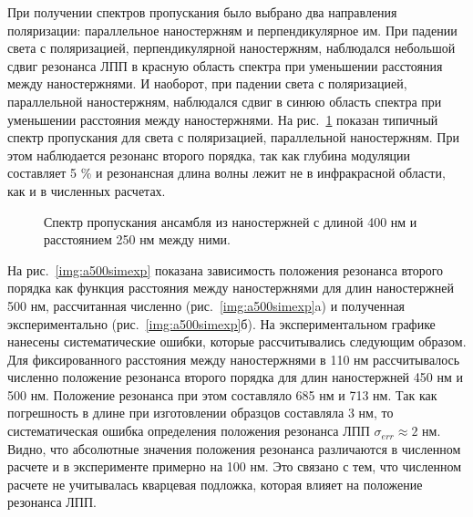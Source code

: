 При получении спектров пропускания было выбрано два направления поляризации: параллельное наностержням и перпендикулярное им. При падении света с поляризацией, перпендикулярной наностержням, наблюдался небольшой сдвиг резонанса ЛПП в красную область спектра при уменьшении расстояния между наностержнями. И наоборот, при падении света с поляризацией, параллельной наностержням, наблюдался сдвиг в синюю область спектра при уменьшении расстояния между наностержнями. На рис.~\ref{img:Spectraa5d3} показан типичный спектр пропускания для света с поляризацией, параллельной наностержням. При этом наблюдается резонанс второго порядка, так как глубина модуляции составляет 5 \% и резонансная длина волны лежит не в инфракрасной области, как и в численных расчетах.
\begin{figure}
\caption{Спектр пропускания ансамбля из наностержней с длиной 400 нм и расстоянием 250 нм между ними.}
\label{img:Spectraa5d3}
\end{figure}
На рис.~\ref{img:a500simexp} показана зависимость положения резонанса второго порядка как функция расстояния между наностержнями для длин наностержней 500 нм, рассчитанная численно (рис.~\ref{img:a500simexp}a) и полученная экспериментально (рис.~\ref{img:a500simexp}б). На экспериментальном графике нанесены систематические ошибки, которые рассчитывались следующим образом. Для фиксированного расстояния между наностержнями в 110 нм рассчитывалось численно положение резонанса второго порядка для длин наностержней 450 нм и 500 нм. Положение резонанса при этом составляло 685 нм и 713 нм. Так как погрешность в длине при изготовлении образцов составляла 3 нм, то систематическая ошибка определения положения резонанса ЛПП  $ \sigma_{err} \approx 2 $ нм. Видно, что абсолютные значения положения резонанса различаются в численном расчете и в эксперименте примерно на 100 нм. Это связано с тем, что численном расчете не учитывалась кварцевая подложка, которая влияет на положение резонанса ЛПП.
